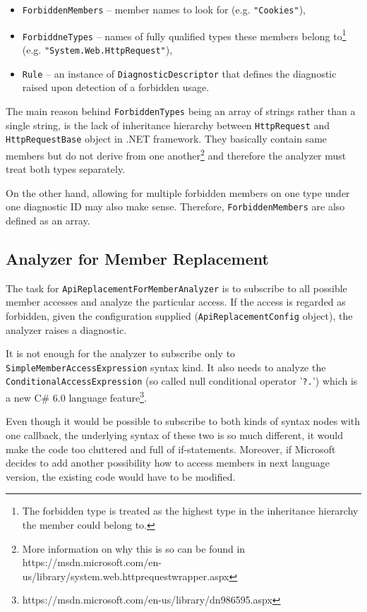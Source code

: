 \documentclass[
  digital, %
  table,   %
  lof,     %
  lot,     %
  oneside,
]{fithesis3}
\begin{document}
\begin{itemize}
  \item \texttt{ForbiddenMembers} -- member names to look for (e.g. \texttt{"Cookies"}), 
  \item \texttt{ForbiddneTypes} -- names of fully qualified types these members belong to\footnote{The forbidden type is treated as the highest type in the inheritance hierarchy the member could belong to.
} (e.g. \texttt{"System.Web.HttpRequest"}), 
  \item \texttt{Rule} -- an instance of \texttt{DiagnosticDescriptor} that defines the diagnostic raised upon detection of a forbidden usage.
\end{itemize} 

The main reason behind \texttt{ForbiddenTypes} being an array of strings rather than a single string, is the lack of inheritance hierarchy between \texttt{HttpRequest} and \texttt{HttpRequestBase} object in .NET framework. They basically contain same members but do not derive from one another\footnote{More information on why this is so can be found in https://msdn.microsoft.com/en-us/library/system.web.httprequestwrapper.aspx} and therefore the analyzer must treat both types separately. 

On the other hand, allowing for multiple forbidden members on one type under one diagnostic ID may also make sense. Therefore, \texttt{ForbiddenMembers} are also defined as an array.

\subsection{Analyzer for Member Replacement}
The task for \texttt{ApiReplacementForMemberAnalyzer} is to subscribe to all possible member accesses and analyze the particular access. If the access is regarded as forbidden, given the configuration supplied (\texttt{ApiReplacementConfig} object), the analyzer raises a diagnostic.

It is not enough for the analyzer to subscribe only to \texttt{SimpleMemberAccessExpression} syntax kind. It also needs to analyze the \texttt{ConditionalAccessExpression} (so called null conditional operator '\texttt{?.}') which is a new C\# 6.0 language feature\footnote{https://msdn.microsoft.com/en-us/library/dn986595.aspx}. 

Even though it would be possible to subscribe to both kinds of syntax nodes with one callback, the underlying syntax of these two is so much different, it would make the code too cluttered and full of if-statements. Moreover, if Microsoft decides to add another possibility how to access members in next language version, the existing code would have to be modified.
\end{document}

